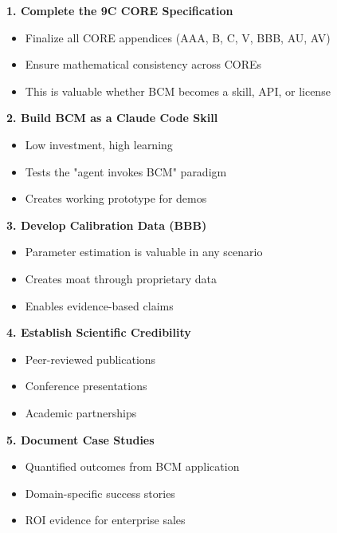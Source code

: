 \begin{tcolorbox}[colback=green!5!white, colframe=green!75!black,
    title=No-Regret Moves (Valid Across All Scenarios)]

\textbf{1. Complete the 9C CORE Specification}
\begin{itemize}[nosep]
\item Finalize all CORE appendices (AAA, B, C, V, BBB, AU, AV)
\item Ensure mathematical consistency across COREs
\item This is valuable whether BCM becomes a skill, API, or license
\end{itemize}

\textbf{2. Build BCM as a Claude Code Skill}
\begin{itemize}[nosep]
\item Low investment, high learning
\item Tests the "agent invokes BCM" paradigm
\item Creates working prototype for demos
\end{itemize}

\textbf{3. Develop Calibration Data (BBB)}
\begin{itemize}[nosep]
\item Parameter estimation is valuable in any scenario
\item Creates moat through proprietary data
\item Enables evidence-based claims
\end{itemize}

\textbf{4. Establish Scientific Credibility}
\begin{itemize}[nosep]
\item Peer-reviewed publications
\item Conference presentations
\item Academic partnerships
\end{itemize}

\textbf{5. Document Case Studies}
\begin{itemize}[nosep]
\item Quantified outcomes from BCM application
\item Domain-specific success stories
\item ROI evidence for enterprise sales
\end{itemize}

\end{tcolorbox}


